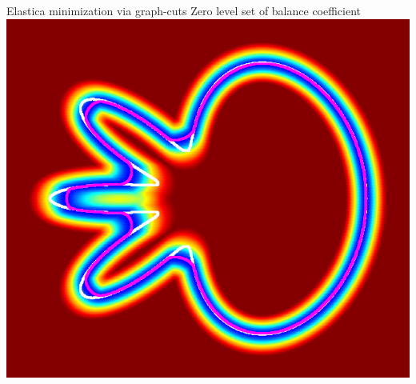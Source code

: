 \begin{frame}
{Elastica minimization via graph-cuts}
{Zero level set of balance coefficient}
\center
\includegraphics[scale=0.25]{figures/non-submodular-elastica/balance-coefficient-zero-level-set.png}
\end{frame}

